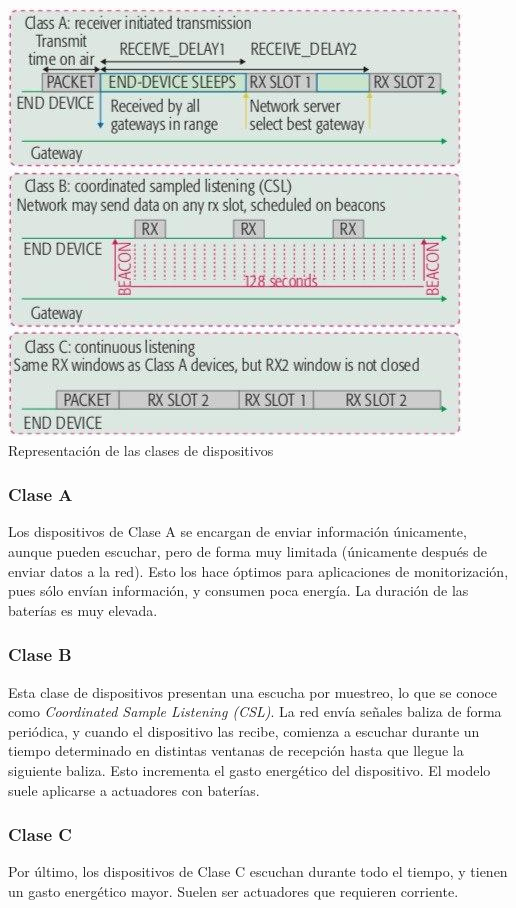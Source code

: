 \documentclass[11pt,a4paper]{article}
\begin{document}
\begin{center}
\includegraphics[scale=0.7]{img/class.jpg} \\
\small{Representación de las clases de dispositivos}
\end{center}


\subsubsection*{Clase A}
Los dispositivos de Clase A se encargan de enviar información únicamente, aunque pueden escuchar, pero de forma muy limitada (únicamente después de enviar datos a la red). Esto los hace óptimos para aplicaciones de monitorización, pues sólo envían información, y consumen poca energía. La duración de las baterías es muy elevada.

\subsubsection*{Clase B}
Esta clase de dispositivos presentan una escucha por muestreo, lo que se conoce como \textit{Coordinated Sample Listening (CSL)}. La red envía señales baliza de forma periódica, y cuando el dispositivo las recibe, comienza a escuchar durante un tiempo determinado en distintas ventanas de recepción hasta que llegue la siguiente baliza. Esto incrementa el gasto energético del dispositivo. El modelo suele aplicarse a actuadores con baterías.

\subsubsection*{Clase C}
Por último, los dispositivos de Clase C escuchan durante todo el tiempo, y tienen un gasto energético mayor. Suelen ser actuadores que requieren corriente.
\end{document}
